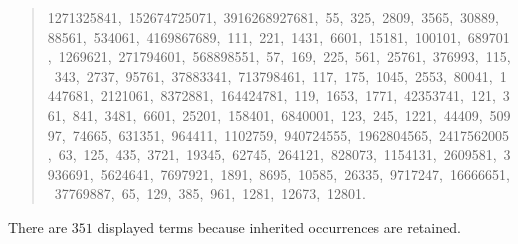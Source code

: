 \documentclass[11pt]{article}
\begin{document}
\begin{enumerate}
\begin{quote}
1271325841,\allowbreak\ 152674725071,\allowbreak\ 3916268927681,\allowbreak\ 55,\allowbreak\ 325,\allowbreak\
2809,\allowbreak\ 3565,\allowbreak\ 30889,\allowbreak\ 88561,\allowbreak\ 534061,\allowbreak\
4169867689,\allowbreak\ 111,\allowbreak\ 221,\allowbreak\ 1431,\allowbreak\ 6601,\allowbreak\
15181,\allowbreak\ 100101,\allowbreak\ 689701,\allowbreak\ 1269621,\allowbreak\ 271794601,\allowbreak\
568898551,\allowbreak\ 57,\allowbreak\ 169,\allowbreak\ 225,\allowbreak\ 561,\allowbreak\ 25761,\allowbreak\
376993,\allowbreak\ 115,\allowbreak\ 343,\allowbreak\ 2737,\allowbreak\ 95761,\allowbreak\
37883341,\allowbreak\ 713798461,\allowbreak\ 117,\allowbreak\ 175,\allowbreak\ 1045,\allowbreak\
2553,\allowbreak\ 80041,\allowbreak\ 1447681,\allowbreak\ 2121061,\allowbreak\ 8372881,\allowbreak\
164424781,\allowbreak\ 119,\allowbreak\ 1653,\allowbreak\ 1771,\allowbreak\ 42353741,\allowbreak\
121,\allowbreak\ 361,\allowbreak\ 841,\allowbreak\ 3481,\allowbreak\ 6601,\allowbreak\ 25201,\allowbreak\
158401,\allowbreak\ 6840001,\allowbreak\ 123,\allowbreak\ 245,\allowbreak\ 1221,\allowbreak\
44409,\allowbreak\ 50997,\allowbreak\ 74665,\allowbreak\ 631351,\allowbreak\ 964411,\allowbreak\
1102759,\allowbreak\ 940724555,\allowbreak\ 1962804565,\allowbreak\ 2417562005,\allowbreak\ 63,\allowbreak\
125,\allowbreak\ 435,\allowbreak\ 3721,\allowbreak\ 19345,\allowbreak\ 62745,\allowbreak\ 264121,\allowbreak\
828073,\allowbreak\ 1154131,\allowbreak\ 2609581,\allowbreak\ 3936691,\allowbreak\ 5624641,\allowbreak\
7697921,\allowbreak\ 1891,\allowbreak\ 8695,\allowbreak\ 10585,\allowbreak\ 26335,\allowbreak\
9717247,\allowbreak\ 16666651,\allowbreak\ 37769887,\allowbreak\ 65,\allowbreak\ 129,\allowbreak\
385,\allowbreak\ 961,\allowbreak\ 1281,\allowbreak\ 12673,\allowbreak\ 12801.
\end{quote}
There are $351$ displayed terms because inherited occurrences are retained.


\end{enumerate}
\end{document}
